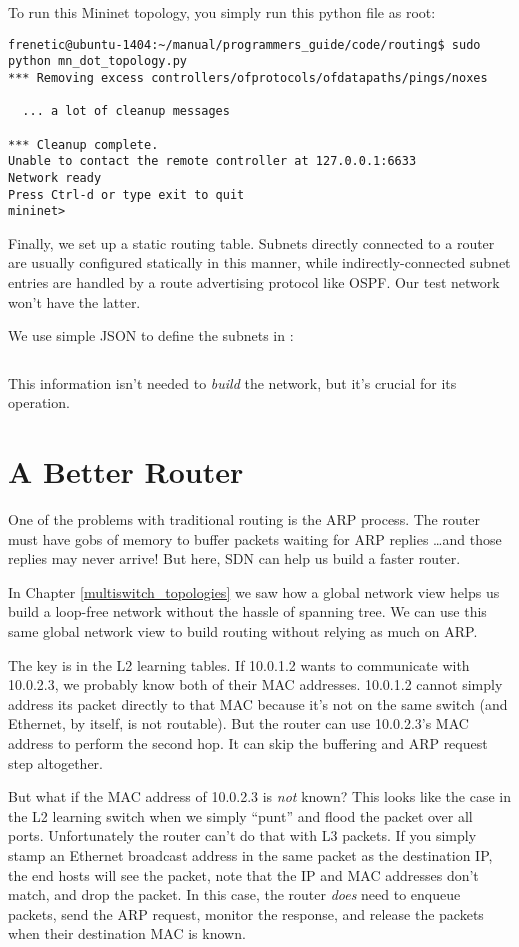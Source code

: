 To run this Mininet topology, you simply run this python file as root:

\begin{verbatim}
frenetic@ubuntu-1404:~/manual/programmers_guide/code/routing$ sudo python mn_dot_topology.py
*** Removing excess controllers/ofprotocols/ofdatapaths/pings/noxes

  ... a lot of cleanup messages 

*** Cleanup complete.
Unable to contact the remote controller at 127.0.0.1:6633
Network ready
Press Ctrl-d or type exit to quit
mininet>
\end{verbatim} 

Finally, we set up a static routing table.   Subnets directly connected to a router are usually 
configured statically in this manner, while indirectly-connected subnet entries are handled by
a route advertising protocol like OSPF.  Our test network won't have the latter.

We use simple JSON to define the subnets in :

\inputminted{json}{code/routing/routing_table.json}

This information isn't needed to \emph{build} the network, but it's crucial for its operation.

\section{A Better Router}

One of the problems with traditional routing is the ARP process.  The router must have gobs of memory 
to buffer packets waiting for ARP replies \ldots and those replies may never arrive!  But here, SDN 
can help us build a faster router.

In Chapter \ref{multiswitch_topologies} we saw how a global network view helps us build a loop-free
network without the hassle of spanning tree.  We can use this same global network view to build
routing without relying as much on ARP.  

The key is in the L2 learning tables.  If 10.0.1.2 wants to communicate with 10.0.2.3, we probably know
both of their MAC addresses.  10.0.1.2 cannot simply address its packet directly to that MAC because
it's not on the same switch (and Ethernet, by itself, is not routable).  But the router can use 
10.0.2.3's MAC address to perform the second hop.  It can skip the buffering and ARP request step
altogether.

But what if the MAC address of 10.0.2.3 is \emph{not} known?  
This looks like the case in the L2 learning switch when we simply ``punt'' and flood the packet
over all ports.  
Unfortunately the router can't do that with L3 packets.  If you simply stamp an Ethernet broadcast
address in the same packet as the destination IP, the end hosts will see the packet, note that 
the IP and MAC addresses don't match, and drop the packet.
In this case, the router \emph{does} need
to enqueue packets, send the ARP request, monitor the response, and release the packets when 
their destination MAC is known.   

